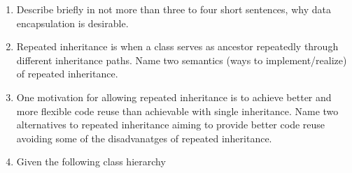 \documentclass{article}
\begin{document}
\begin{enumerate}
\item Describe briefly in not more than three to four short sentences,
  why data encapsulation is desirable.
\item Repeated inheritance is when a class serves as ancestor
  repeatedly through different inheritance paths. Name two semantics
  (ways to implement/realize) of repeated inheritance. 
\item One motivation for allowing repeated inheritance is to achieve
  better and more flexible code reuse than achievable with single
  inheritance. Name two alternatives to repeated inheritance aiming to
  provide better code reuse avoiding some of the disadvanatges of
  repeated inheritance. 
\item Given the following class
  hierarchy \\
\begin{center}

\end{center}
\end{enumerate}
\end{document}
